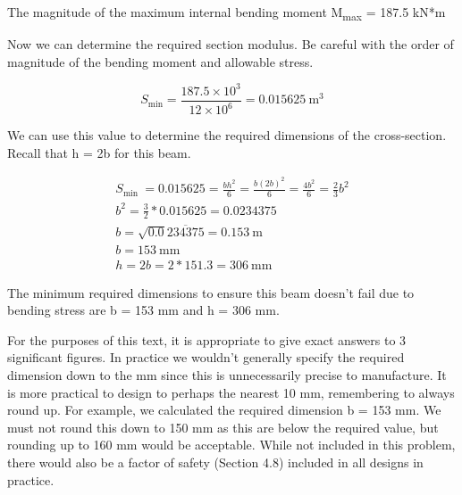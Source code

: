 \documentclass[
  letterpaper,
  DIV=11,
  numbers=noendperiod]{scrreprt}
\begin{document}
\begin{tcolorbox}
The magnitude of the maximum internal bending moment
\textbar M\textsubscript{max}\textbar{} = 187.5 kN*m

Now we can determine the required section modulus. Be careful with the
order of magnitude of the bending moment and allowable stress.

\[
S_\text{min}=\frac{187.5\times10^3}{12\times10^6}=0.015625 \mathrm{~m}^3
\]

We can use this value to determine the required dimensions of the
cross-section. Recall that h = 2b for this beam.

\[
\begin{gathered}
S_{\text {min }}=0.015625=\frac{b h^2}{6}=\frac{b(2 b)^2}{6}=\frac{4 b^2}{6}=\frac{2}{3} b^2 \\
b^2=\frac{3}{2} * 0.015625=0.0234375 \\
b=\sqrt{0.0} \overline{234375}=0.153 \mathrm{~m} \\
b=153 \mathrm{~mm} \\
h=2 b=2 * 151.3=306 \mathrm{~mm}
\end{gathered}
\]

The minimum required dimensions to ensure this beam doesn't fail due to
bending stress are b = 153 mm and h = 306 mm.

\end{tcolorbox}

For the purposes of this text, it is appropriate to give exact answers
to 3 significant figures. In practice we wouldn't generally specify the
required dimension down to the mm since this is unnecessarily precise to
manufacture. It is more practical to design to perhaps the nearest 10
mm, remembering to always round up. For example, we calculated the
required dimension b = 153 mm. We must not round this down to 150 mm as
this are below the required value, but rounding up to 160 mm would be
acceptable. While not included in this problem, there would also be a
factor of safety (Section 4.8) included in all designs in practice.
\end{document}
